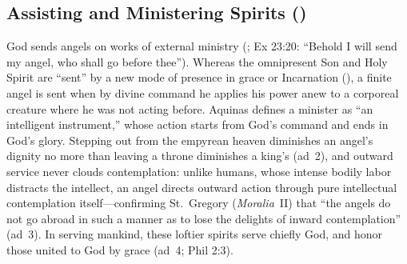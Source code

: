
\subsection{Assisting and Ministering Spirits ()}

God sends angels on works of external ministry (; Ex 23:20: ``Behold I will send my angel, who shall go before thee''). Whereas the omnipresent Son and Holy Spirit are ``sent'' by a new mode of presence in grace or Incarnation (), a finite angel is sent when by divine command he applies his power anew to a corporeal creature where he was not acting before. Aquinas defines a minister as ``an intelligent instrument,'' whose action starts from God's command and ends in God's glory. Stepping out from the empyrean heaven diminishes an angel's dignity no more than leaving a throne diminishes a king's (ad~2), and outward service never clouds contemplation: unlike humans, whose intense bodily labor distracts the intellect, an angel directs outward action through pure intellectual contemplation itself---confirming St.~Gregory (\emph{Moralia}~II) that ``the angels do not go abroad in such a manner as to lose the delights of inward contemplation'' (ad~3). In serving mankind, these loftier spirits serve chiefly God, and honor those united to God by grace (ad~4; Phil 2:3).

